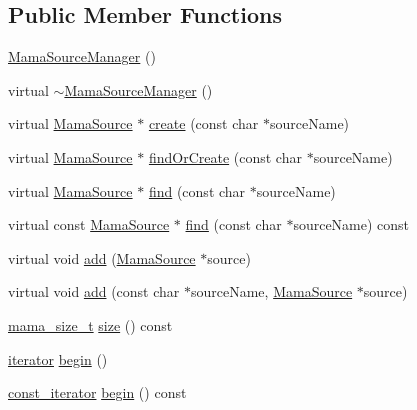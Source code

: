 \subsection*{Public Member Functions}
\begin{DoxyCompactItemize}
\item 
\hyperlink{classWombat_1_1MamaSourceManager_ab8b625fb94edc7ab2e9667dc5fa6ff5a}{MamaSourceManager} ()
\item 
virtual \hyperlink{classWombat_1_1MamaSourceManager_a1f01b8eeb2c6c25aea10f343818dc631}{$\sim$MamaSourceManager} ()
\item 
virtual \hyperlink{classWombat_1_1MamaSource}{MamaSource} $\ast$ \hyperlink{classWombat_1_1MamaSourceManager_a48e8e63e2e5d5992f374165f63b7ae9c}{create} (const char $\ast$sourceName)
\item 
virtual \hyperlink{classWombat_1_1MamaSource}{MamaSource} $\ast$ \hyperlink{classWombat_1_1MamaSourceManager_aeadd2948a8f91b35875ba7648b38a7f9}{findOrCreate} (const char $\ast$sourceName)
\item 
virtual \hyperlink{classWombat_1_1MamaSource}{MamaSource} $\ast$ \hyperlink{classWombat_1_1MamaSourceManager_a378d8f731a0482fdbcf4147fee8e8d16}{find} (const char $\ast$sourceName)
\item 
virtual const \hyperlink{classWombat_1_1MamaSource}{MamaSource} $\ast$ \hyperlink{classWombat_1_1MamaSourceManager_aa54946b75daea1c445ce03b6f863dd56}{find} (const char $\ast$sourceName) const 
\item 
virtual void \hyperlink{classWombat_1_1MamaSourceManager_ae36a1971e3107d9623faef31c4d867bc}{add} (\hyperlink{classWombat_1_1MamaSource}{MamaSource} $\ast$source)
\item 
virtual void \hyperlink{classWombat_1_1MamaSourceManager_a1cd90bf091046284bd5c18bfc03269a6}{add} (const char $\ast$sourceName, \hyperlink{classWombat_1_1MamaSource}{MamaSource} $\ast$source)
\item 
\hyperlink{classmama__size__t}{mama\_\-size\_\-t} \hyperlink{classWombat_1_1MamaSourceManager_ac20ceefc8eea2e1c7e63c151f92a9b1f}{size} () const 
\item 
\hyperlink{classWombat_1_1MamaSourceManager_1_1iterator}{iterator} \hyperlink{classWombat_1_1MamaSourceManager_aa267a206bb4ff04f82bd50926ba930b3}{begin} ()
\item 
\hyperlink{classWombat_1_1MamaSourceManager_1_1iterator}{const\_\-iterator} \hyperlink{classWombat_1_1MamaSourceManager_a2ff1856ac4db746e873569d1f6f5dd13}{begin} () const 
\item 

\end{DoxyCompactItemize}
